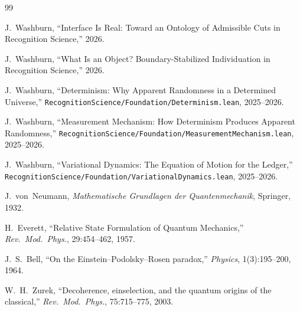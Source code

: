 \documentclass[11pt,a4paper]{article}
\theoremstyle{plain}
\theoremstyle{definition}
\theoremstyle{remark}
\begin{document}
\begin{thebibliography}{99}

J.~Washburn, ``Interface Is Real: Toward an Ontology of Admissible Cuts in Recognition Science,'' 2026.

J.~Washburn, ``What Is an Object? Boundary-Stabilized Individuation in Recognition Science,'' 2026.

J.~Washburn, ``Determinism: Why Apparent Randomness in a Determined Universe,'' \texttt{RecognitionScience/Foundation/Determinism.lean}, 2025--2026.

J.~Washburn, ``Measurement Mechanism: How Determinism Produces Apparent Randomness,'' \texttt{RecognitionScience/Foundation/MeasurementMechanism.lean}, 2025--2026.

J.~Washburn, ``Variational Dynamics: The Equation of Motion for the Ledger,'' \texttt{RecognitionScience/Foundation/VariationalDynamics.lean}, 2025--2026.

J.~von~Neumann, \emph{Mathematische Grundlagen der Quantenmechanik}, Springer, 1932.

H.~Everett, ``Relative State Formulation of Quantum Mechanics,'' \emph{Rev.~Mod.~Phys.}, 29:454--462, 1957.

J.~S.~Bell, ``On the Einstein--Podolsky--Rosen paradox,'' \emph{Physics}, 1(3):195--200, 1964.

W.~H.~Zurek, ``Decoherence, einselection, and the quantum origins of the classical,'' \emph{Rev.~Mod.~Phys.}, 75:715--775, 2003.

\end{thebibliography}
\end{document}

